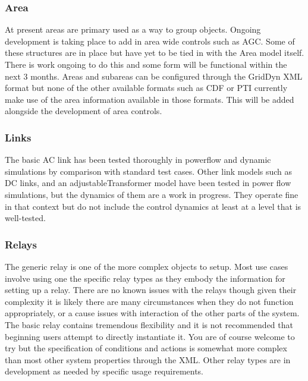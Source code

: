 \documentclass[12pt]{article} %
\begin{document}
\subsubsection{Area}
At present areas are primary used as a way to group objects.  Ongoing development is taking place to add in area wide controls such as AGC.  Some of these structures are in place but have yet to be tied in with the Area model itself.  There is work ongoing to do this and some form will be functional within the next 3 months.  Areas and subareas can be configured through the GridDyn XML format but none of the other available formats such as CDF or PTI currently make use of the area information available in those formats.  This will be added alongside the development of area controls.  

\subsubsection{Links}
The basic AC link has been tested thoroughly in powerflow and dynamic simulations by comparison with standard test cases.  Other link models such as DC links, and an adjustableTransformer model have been tested in power flow simulations, but the dynamics of them are a work in progress.  They operate fine in that context but do not include the control dynamics at least at a level that is well-tested.  

\subsubsection{Relays}
The generic relay is one of the more complex objects to setup.  Most use cases involve using one the specific relay types as they embody the information for setting up a relay.  There are no known issues with the relays though given their complexity it is likely there are many circumstances when they do not function appropriately, or a cause issues with interaction of the other parts of the system.  The basic relay contains tremendous flexibility and it is  not recommended that beginning users attempt to directly instantiate it.  You are of course welcome to try but the specification of conditions and actions is somewhat more complex than most other system properties through the XML.  Other relay types are in development as needed by specific usage requirements.  
\end{document}
